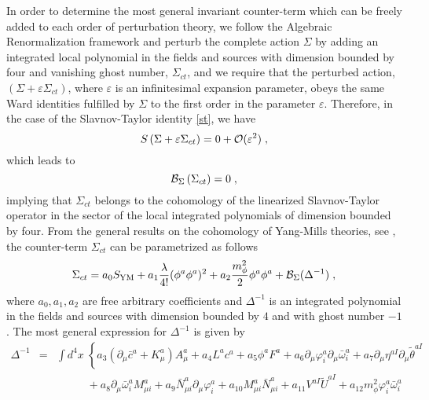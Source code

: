 \begin{appendix}
In order to determine the most general invariant counter-term which can be freely added to each order of perturbation theory, we follow the Algebraic Renormalization framework  \cite{Piguet:1995er} and perturb  the complete action $\Sigma$ by adding an integrated local polynomial in the fields and sources with dimension bounded by four and vanishing ghost number, $\Sigma_{ct}$, and we require that the perturbed action, $(\Sigma + \varepsilon \Sigma_{ct})$, where $\varepsilon$ is an infinitesimal expansion parameter, obeys the same Ward identities fulfilled by $\Sigma$ to the first order in the parameter $\varepsilon$. Therefore, in the  case of the Slavnov-Taylor identity  \eqref{st}, we have
\begin{equation}
S\left( \Sigma + \varepsilon\Sigma_{ct} \right) = 0 + {\cal O}(\varepsilon^{2})\;,   \label{pertb1}
\end{equation}
which leads to
\begin{equation}
{\cal B}_{\Sigma}\left( \Sigma_{ct} \right) = 0\;, \label{perturblin}
\end{equation}
implying that $\Sigma_{ct}$ belongs to the cohomology of the linearized Slavnov-Taylor operator
in the sector of the local integrated polynomials of dimension bounded by four. From the
general results on the cohomology of Yang-Mills theories, see \cite{Piguet:1995er},  the
counter-term $\Sigma_{ct}$ can be parametrized as follows 
\begin{equation}
	\Sigma_{ct} = a_{0}S_{\text{YM}}+a_{1}\frac{\lambda}{4!}(\phi^{a}\phi^{a})^{2}+a_{2}\frac{m_{\phi}^{2}}{2}\phi^{a}\phi^{a} + {\cal B}_{\Sigma}(\Delta^{-1})\;, \label{ctp}
\end{equation}
where $a_{0}, a_{1}, a_{2}$ are free arbitrary coefficients and  $\Delta^{-1}$ is an integrated polynomial in the fields and sources with dimension bounded by $4$ and with ghost number $-1$. The most general expression  for $\Delta^{-1}$  is given by 
\begin{eqnarray}
\Delta^{-1} &=& \int d^{4}x\; \left\{ a_{3}(\partial_{\mu}\bar{c}^{a} + K^{a}_{\mu})A^{a}_{\mu}
+ a_{4}L^{a}c^{a}
+ a_{5}\phi^{a}F^{a}
+ a_{6}\partial_{\mu}\varphi^{a}_{i}\partial_{\mu}\bar{\omega}^{a}_{i}
+ a_{7}\partial_{\mu}\eta^{aI}\partial_{\mu}\tilde{\theta}^{aI}
\right.
\nonumber \\
&&
\phantom{\int d^{4}x\;}
+ a_{8}\partial_{\mu}\bar{\omega}^{a}_{i}M^{a}_{\mu i}
+ a_{9}\bar{N}^{a}_{\mu i}\partial_{\mu}\varphi^{a}_{i}
+ a_{10}M^{a}_{\mu i}\bar{N}^{a}_{\mu i}
+ a_{11}V^{aI}\tilde{U}^{aI}
+ a_{12}m_{\phi}^{2}\varphi^{a}_{i}\bar{\omega}^{a}_{i}

\end{eqnarray}
\end{appendix}
